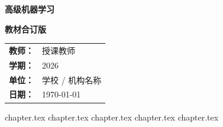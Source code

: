 \documentclass[UTF8,a4paper,zihao=-4,oneside,openany]{ctexbook}
\newcommand{\coursename}{高级机器学习}
\newcommand{\semester}{2026}
\newcommand{\teacher}{授课教师}
\newcommand{\school}{学校 / 机构名称}
\newcommand{\lessondate}{\today}
\begin{document}
\begin{titlepage}
  \centering
  \vspace*{1.5cm}
  {\bfseries\color{CourseBlue}\coursename\par}
  \vspace{0.8cm}
  {\bfseries 教材合订版\par}
  \vspace{1.2cm}
  \vfill
  \begin{tabular}{rl}
    \textbf{教师：} & \teacher \\
    \textbf{学期：} & \semester \\
    \textbf{单位：} & \school \\
    \textbf{日期：} & \lessondate \\
  \end{tabular}
  \vspace*{1.2cm}
\end{titlepage}

\frontmatter
\pagestyle{plain}
\tableofcontents
\cleardoublepage

\mainmatter
\pagestyle{fancy}

{chapter.tex}
{chapter.tex}
{chapter.tex}
{chapter.tex}
{chapter.tex}

\backmatter

\end{document}
